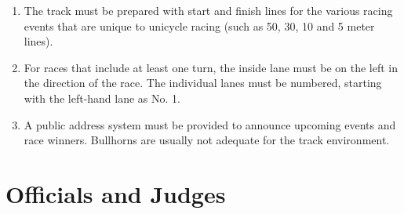 \begin{enumerate}[leftmargin=1.5em,labelsep=*]
\begin{enumerate}[label*=\arabic*,leftmargin=1.5em,labelsep=*]
		\item The measurement must be taken 0.30 m outward from the kerb or, where no kerb exists on a bend, 
    0.20 m from the line marking the inside of the track.
		
		\item The distance of the race must be measured from the edge of the start line farther from the 
    finish to the edge of the finish line nearer to the start.
		
		\item In all races up to and including 400 m, each rider must have a separate lane, with a width of 
    1.22 m $\pm$ 0.01 m, including the lane line on the right, marked by white lines 50 mm in width.
		All lanes must be of the same nominal width. The inner lane must be measured as stated in 
    pragraph 2.3, but the remaining lanes must be measured 0.20 m from the outer edges of the lines.
	\end{enumerate}
	
	\item The track must be prepared with start and finish lines for the various racing events that are 
  unique to unicycle racing (such as 50, 30, 10 and 5 meter lines).
	
	\item For races that include at least one turn, the inside lane must be on the left in the 
  direction of the race. The individual lanes must be numbered, starting with the left-hand lane as No. 1.
	
	\item A public address system must be provided to announce upcoming events and race winners.
	Bullhorns are usually not adequate for the track environment.
\end{enumerate}

\section{Officials and Judges}

